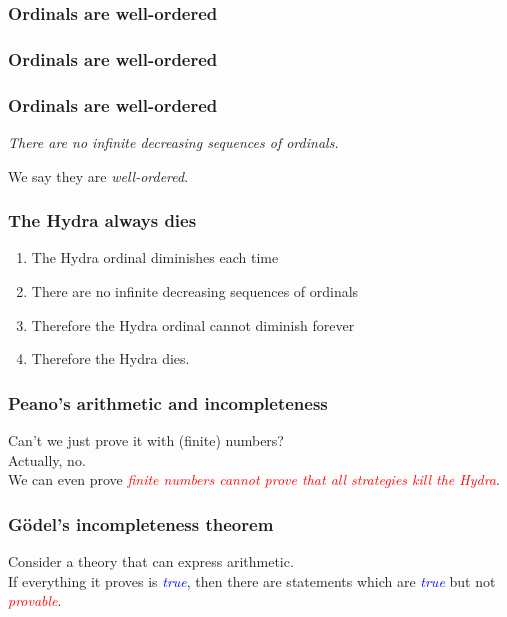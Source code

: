 \documentclass{beamer}
\begin{document}
\begin{frame}
  \frametitle{Ordinals are well-ordered}
  \Huge
\end{frame}

\begin{frame}
  \frametitle{Ordinals are well-ordered}
  \Huge
\end{frame}

\begin{frame}
  \frametitle{Ordinals are well-ordered}
  \Huge \emph{There are no infinite decreasing sequences of ordinals.}

  \pause We say they are \emph{well-ordered}.
\end{frame}

\begin{frame}
  \frametitle{The Hydra always dies}
  \Large
  \begin{enumerate}
  \item The Hydra ordinal diminishes each time
  \pause
  \item There are no infinite decreasing sequences of ordinals
  \pause
  \item Therefore the Hydra ordinal cannot diminish forever
  \pause
  \item Therefore the Hydra dies.
  \end{enumerate}
\end{frame}

\begin{frame}
  \frametitle{Peano's arithmetic and incompleteness}
  \Huge
  Can't we just prove it with (finite) numbers? \\
  \pause Actually, no. \\
  \pause We can even prove \textcolor{red}{\emph{finite numbers cannot prove that all strategies kill the Hydra}}.
\end{frame}

\begin{frame}
  \frametitle{Gödel's incompleteness theorem}
  \Huge Consider a theory that can express arithmetic. \\
  \pause If everything it proves is \textcolor{blue}{\emph{true}}, then there are statements which are \textcolor{blue}{\emph{true}} but not \textcolor{red}{\emph{provable}}.
\end{frame}
\end{document}
